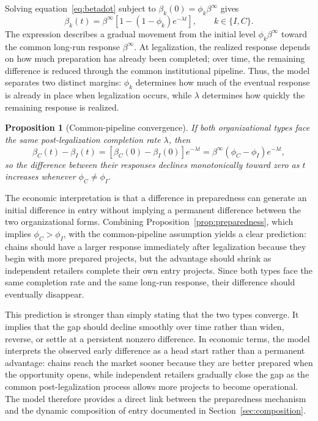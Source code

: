 \documentclass[english,12pt]{article}
\newtheorem{proposition}{Proposition}
\begin{document}
Solving equation~\eqref{eq:betadot} subject to $\beta_k(0)=\phi_k\beta^\infty$ gives
\begin{equation}
\label{eq:diffusion}
\beta_k(t)
=
\beta^\infty
\left[
1-(1-\phi_k)e^{-\lambda t}
\right],
\qquad
k\in\{I,C\}.
\end{equation}
The expression describes a gradual movement from the initial level $\phi_k\beta^\infty$ toward the common long-run response $\beta^\infty$. At legalization, the realized response depends on how much preparation has already been completed; over time, the remaining difference is reduced through the common institutional pipeline. Thus, the model separates two distinct margins: $\phi_k$ determines how much of the eventual response is already in place when legalization occurs, while $\lambda$ determines how quickly the remaining response is realized.

\begin{proposition}[Common-pipeline convergence]
\label{prop:convergence}
If both organizational types face the same post-legalization completion rate $\lambda$, then
\[
\beta_C(t)-\beta_I(t)
=
\left[
\beta_C(0)-\beta_I(0)
\right]e^{-\lambda t}
=
\beta^\infty(\phi_C-\phi_I)e^{-\lambda t},
\]
so the difference between their responses declines monotonically toward zero as $t$ increases whenever $\phi_C\neq\phi_I$.
\end{proposition}

The economic interpretation is that a difference in preparedness can generate an initial difference in entry without implying a permanent difference between the two organizational forms. Combining Proposition~\ref{prop:preparedness}, which implies $\phi_C>\phi_I$, with the common-pipeline assumption yields a clear prediction: chains should have a larger response immediately after legalization because they begin with more prepared projects, but the advantage should shrink as independent retailers complete their own entry projects. Since both types face the same completion rate and the same long-run response, their difference should eventually disappear.

This prediction is stronger than simply stating that the two types converge. It implies that the gap should decline smoothly over time rather than widen, reverse, or settle at a persistent nonzero difference. In economic terms, the model interprets the observed early difference as a head start rather than a permanent advantage: chains reach the market sooner because they are better prepared when the opportunity opens, while independent retailers gradually close the gap as the common post-legalization process allows more projects to become operational. The model therefore provides a direct link between the preparedness mechanism and the dynamic composition of entry documented in Section~\ref{sec:composition}.
\end{document}
